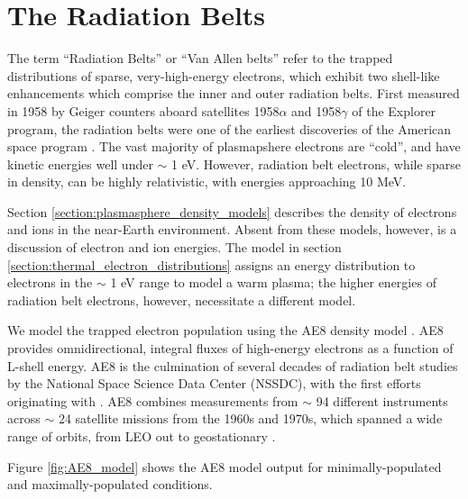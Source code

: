 \section{The Radiation Belts}
The term ``Radiation Belts'' or ``Van Allen belts'' refer to the trapped distributions of sparse, very-high-energy electrons, which exhibit two shell-like enhancements which comprise the inner and outer radiation belts. First measured in 1958 by Geiger counters aboard satellites 1958$\alpha$ and 1958$\gamma$ of the Explorer program, the radiation belts were one of the earliest discoveries of the American space program \citep{VanAllen1958}. The vast majority of plasmapshere electrons are ``cold'', and have kinetic energies well under $\sim$ 1 eV. However, radiation belt electrons, while sparse in density, can be highly relativistic, with energies approaching 10 MeV.

Section \ref{section:plasmasphere_density_models} describes the density of electrons and ions in the near-Earth environment. Absent from these models, however, is a discussion of electron and ion energies. The model in section \ref{section:thermal_electron_distributions} assigns an energy distribution to electrons in the $\sim$ 1 eV range to model a warm plasma; the higher energies of radiation belt electrons, however, necessitate a different model.

We model the trapped electron population using the AE8 density model \citep{Vette1991}. AE8 provides omnidirectional, integral fluxes of high-energy electrons as a function of L-shell energy. AE8 is the culmination of several decades of radiation belt studies by the National Space Science Data Center (NSSDC), with the first efforts originating with \cite{Vette1966}. AE8 combines measurements from $\sim$ 94 different instruments across $\sim$ 24 satellite missions from the 1960s and 1970s, which spanned a wide range of orbits, from LEO out to geostationary \citep{Cayton2005}.

Figure \ref{fig:AE8_model} shows the AE8 model output for minimally-populated and maximally-populated conditions. 

